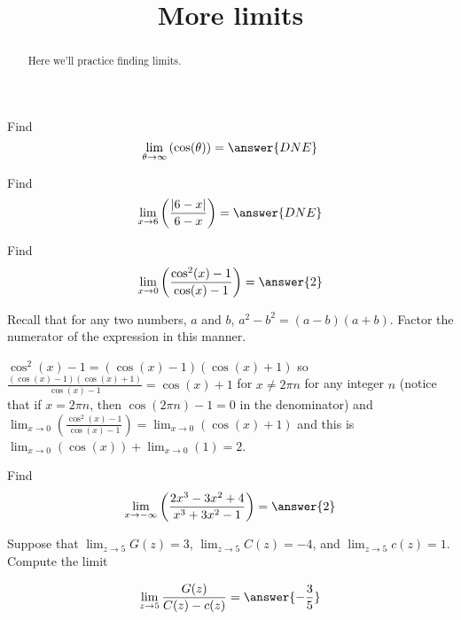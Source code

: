 \documentclass[handout]{ximera}
\title{More limits}
\begin{document}
\begin{abstract}
  Here we'll practice finding limits.
\end{abstract}
\maketitle

\begin{exercise}
Find
\[
\lim_{\theta\to\infty}\left(\cos(\theta)\right)
= \answer{DNE}
\]

\end{exercise}


\begin{exercise}
Find
\[
\lim_{x\to6}\left(\frac{\left|6-x\right|}{6-x}\right)
= \answer{DNE}
\]

\end{exercise}

\begin{exercise}
Find
\[
\lim_{x\to0}\left(\frac{\cos^{2}(x)-1}{\cos(x)-1}\right)
= \answer{2}
\]

\begin{hint}
Recall that for any two numbers, $a$ and $b$,  $a^2-b^2=(a-b)(a+b)$. Factor the numerator of the expression in this manner.
\end{hint}
\begin{hint}
$\cos^{2}(x)-1=(\cos(x)-1)(\cos(x)+1)$ so $\frac{(\cos(x)-1)(\cos(x)+1)}{\cos(x)-1}=\cos(x)+1$ for $x\ne2\pi{n}$ for any integer $n$ (notice that if $x=2\pi n$, then $\cos(2\pi n)-1=0$ in the denominator) and $\lim_{x\to0}\left(\frac{\cos^{2}(x)-1}{\cos(x)-1}\right)=\lim_{x\to0}\left(\cos(x)+1\right)$ and this is $\lim_{x\to0}\left(\cos(x)\right)+\lim_{x\to0}\left(1\right)=2$.

\end{hint}
\end{exercise}

\begin{exercise}
Find
\[
\lim_{x\to-\infty}\left(\frac{2x^3-3x^2+4}{x^3+3x^2-1}\right)
= \answer{2}
\]

\end{exercise}


\begin{exercise}
Suppose that $\lim_{z\to5}G(z)=3$, $\lim_{z\to5}C(z)=-4$, and $\lim_{z\to5}c(z)=1$. Compute the limit

\[
\lim_{z\to 5 } \frac{G(z)}{C(z)-c(z)} = \answer{-\frac{3}{5}}
\]
\end{exercise}
\end{document}
